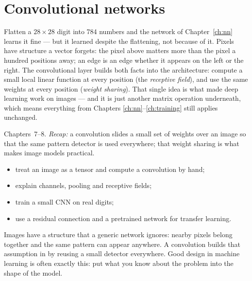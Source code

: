 \chapter{Convolutional networks}
\label{ch:cnn}

Flatten a $28\times28$ digit into 784 numbers and the network of
Chapter~\ref{ch:nn} learns it fine --- but it learned despite the
flattening, not because of it. Pixels have structure a vector forgets:
the pixel above matters more than the pixel a hundred positions away;
an edge is an edge whether it appears on the left or the right. The
convolutional layer builds both facts into
the architecture: compute a small local linear function at every
position (the \emph{receptive field}), and use the same weights at
every position (\emph{weight sharing}). That single idea is what made
deep learning work on images --- and it is just another matrix
operation underneath, which means everything from Chapters
\ref{ch:nn}--\ref{ch:training} still applies unchanged.

\begin{rulebox}
Chapters~7--8. \emph{Recap:} a convolution slides a small set of weights over an image so that the same pattern detector is used everywhere; that weight sharing is what makes image models practical.
\end{rulebox}
\begin{wins}
\begin{itemize}
\item treat an image as a tensor and compute a convolution by hand;
\item explain channels, pooling and receptive fields;
\item train a small CNN on real digits;
\item use a residual connection and a pretrained network for transfer learning.
\end{itemize}
\end{wins}
\begin{principle}
Images have a structure that a generic network ignores: nearby pixels belong together and the same pattern can appear anywhere. A convolution builds that assumption in by reusing a small detector everywhere. Good design in machine learning is often exactly this: put what you know about the problem into the shape of the model.
\end{principle}


